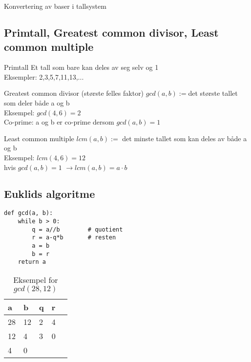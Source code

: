 \begin{frame}
Konvertering av baser i tallsystem
\end{frame}

\subsection*{Primtall, Greatest common divisor, Least common multiple}
\begin{frame}
\begin{block}{Primtall}
Et tall som bare kan deles av seg selv og 1\\
Eksempler: 2,3,5,7,11,13,...
\end{block}

\begin{block}{Greatest common divisor (største felles faktor)}
$gcd(a,b) := $det største tallet som deler både a og b\\
Eksempel: $gcd(4,6)=2$\\
Co-prime: a og b er co-prime dersom $gcd(a,b)=1$
\end{block}

\begin{block}{Least common multiple}
$lcm(a,b) := $ det minste tallet som kan deles av både a og b\\
Eksempel: $lcm(4,6)=12$\\
hvis $gcd(a,b) = 1$ $\rightarrow lcm(a,b) = a\cdot b$
\end{block}
\end{frame}

\subsection*{Euklids algoritme}
\begin{frame}[fragile]
\begin{verbatim}
def gcd(a, b):
    while b > 0:
        q = a//b        # quotient
        r = a-q*b       # resten
        a = b
        b = r
    return a
\end{verbatim}
\begin{table}
\begin{tabular}{l|l|l|l|l}
a & b & q & r \\ \hline
28 & 12 & 2 & 4\\
12 & 4 & 3 & 0\\
4 & 0 &  & 
\end{tabular}
\caption{Eksempel for $gcd(28,12)$}
\end{table}
\end{frame}

